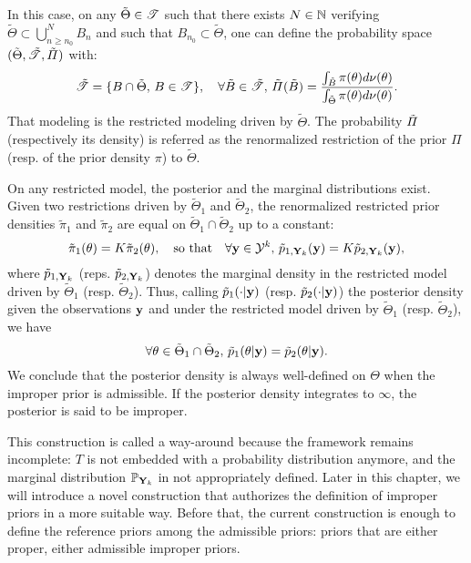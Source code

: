 In this case, on any $\tilde\Theta\in\mathscr{T}$ such that there exists $N\in\mathbb{N}$ verifying $\tilde\Theta\subset\bigcup_{n\geq n_0}^NB_n$ and such that $B_{n_0}\subset\tilde\Theta$, one can define the probability space $(\tilde\Theta,\tilde{\mathscr{T}},\tilde\varPi)$ with:
    \begin{equation}
        \tilde{\mathscr{T}} = \{B\cap\tilde\Theta,\,B\in\mathscr{T}\},\quad\forall \tilde B\in\tilde{\mathscr{T}},\,\tilde\varPi(\tilde B) = \frac{\int_{\tilde B}\pi(\theta)d\nu(\theta)}{\int_{\tilde\Theta}\pi(\theta)d\nu(\theta)}.
    \end{equation}
That modeling is the restricted modeling driven by $\tilde\Theta$. 
The probability $\Tilde\varPi$ (respectively its density) is referred as the renormalized restriction of the prior $\varPi$ (resp. of the prior density $\pi$) to $\tilde\Theta$.

On any restricted model, the posterior and the marginal distributions exist. 
Given two restrictions driven by $\tilde\Theta_1$ and $\tilde\Theta_2$, the renormalized restricted prior densities $\tilde\pi_1$ and $\tilde\pi_2$ are equal on $\tilde\Theta_1\cap\tilde\Theta_2$ up to a constant:
    \begin{equation}
        \tilde\pi_1(\theta) = K\tilde\pi_2(\theta),\quad\text{so that}\quad \forall \mathbf{y}\in\mathcal{Y}^k,\,\tilde p_{1,\mathbf{Y}_k}(\mathbf{y}) = K\tilde p_{2,\mathbf{Y}_k}(\mathbf{y}),
    \end{equation}
where $\tilde p_{1,\mathbf{Y}_k}$ (reps. $\tilde p_{2,\mathbf{Y}_k}$) denotes the marginal density in the restricted model driven by $\tilde\Theta_1$ (resp. $\tilde\Theta_2$). Thus, calling $\tilde p_1(\cdot | \mathbf{y})$ (resp. $\tilde p_2(\cdot | \mathbf{y})$) the posterior density given the observations $\mathbf{y}$ and under the restricted model driven by $\tilde\Theta_1$ (resp. $\tilde\Theta_2$), we have
    \begin{equation}
        \forall\theta\in\tilde\Theta_1\cap\tilde\Theta_2,\, \tilde p_1(\theta | \mathbf{y}) =\tilde p_2(\theta | \mathbf{y}).
    \end{equation}
We conclude that the posterior density is always well-defined on $\Theta$ when the improper prior is admissible.
If the posterior density integrates to $\infty$, the posterior is said to be improper.



This construction is called a way-around because the framework remains incomplete: $T$ is not embedded with a probability distribution  anymore, and %
the marginal distribution $\mathbb{P}_{\mathbf{Y}_k}$ in not appropriately defined. 
Later in this chapter, we will introduce a novel construction that authorizes the definition of improper priors in a more suitable way.
Before that, the current construction is enough to define the reference priors among the admissible priors: priors that are either proper, either admissible improper priors.


